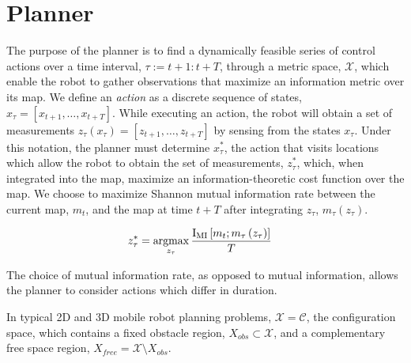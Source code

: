 \documentclass[conference]{IEEEtran}
\begin{document}
\section{Planner}

The purpose of the planner is to find a dynamically feasible series of control actions over a time interval, $\tau := t+1 : t+T$, through a metric space, $\mathcal{X}$, which enable the robot to gather observations that maximize an information metric over its map. We define an \textit{action} as a discrete sequence of states, $x_{\tau} = \left[x_{t+1},\dots,x_{t+T}\right]$. While executing an action, the robot will obtain a set of measurements $z_{\tau}(x_{\tau}) = \left[z_{t+1},\dots,z_{t+T}\right]$ by sensing from the states $x_{\tau}$. Under this notation, the planner must determine $x_{\tau}^{*}$, the action that visits locations which allow the robot to obtain the set of measurements, $z_{\tau}^{*}$, which, when integrated into the map, maximize an information-theoretic cost function over the map. We choose to maximize Shannon mutual information rate between the current map, $m_t$, and the map at time $t+T$ after integrating $z_{\tau}$, $m_{\tau}(z_{\tau})$.

\begin{align} \begin{split}
  z_{\tau}^{*}
  &=
  \argmax_{z_{\tau}}
  \frac{\text{I}_{\text{MI}}\left[m_{t}; m_{\tau}\left(z_{\tau}\right) \right]}
  {T}
\end{split} \end{align}

The choice of mutual information rate, as opposed to mutual information, allows the planner to consider actions which differ in duration.

In typical 2D and 3D mobile robot planning problems, $\mathcal{X} = \mathcal{C}$, the configuration space, which contains a fixed obstacle region, $X_{obs} \subset \mathcal{X}$, and a complementary free space region, $X_{free} = \mathcal{X} \setminus X_{obs}$.
\end{document}

